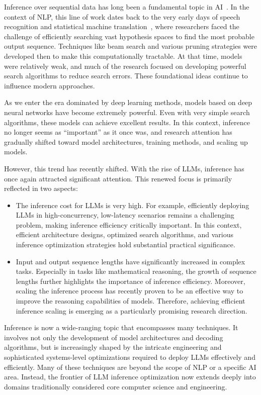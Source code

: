 Inference over sequential data has long been a fundamental topic in AI~\cite{wozengraft-and-reiffen:1961,viterbi:1967error,forney-etal:1972maximum}. In the context of NLP, this line of work dates back to the very early days of speech recognition and statistical machine translation~\cite{Koehn:2010}, where researchers faced the challenge of efficiently searching vast hypothesis spaces to find the most probable output sequence. Techniques like beam search and various pruning strategies were developed then to make this computationally tractable. At that time, models were relatively weak, and much of the research focused on developing powerful search algorithms to reduce search errors. These foundational ideas continue to influence modern approaches.

As we enter the era dominated by deep learning methods, models based on deep neural networks have become extremely powerful. Even with very simple search algorithms, these models can achieve excellent results. In this context, inference no longer seems as ``important'' as it once was, and research attention has gradually shifted toward model architectures, training methods, and scaling up models.

However, this trend has recently shifted. With the rise of LLMs, inference has once again attracted significant attention. This renewed focus is primarily reflected in two aspects:

\begin{itemize}
\item \vspace{0.5em} The inference cost for LLMs is very high. For example, efficiently deploying LLMs in high-concurrency, low-latency scenarios remains a challenging problem, making inference efficiency critically important. In this context, efficient architecture designs, optimized search algorithms, and various inference optimization strategies hold substantial practical significance.
\item \vspace{0.3em} Input and output sequence lengths have significantly increased in complex tasks. Especially in tasks like mathematical reasoning, the growth of sequence lengths further highlights the importance of inference efficiency. Moreover, scaling the inference process has recently proven to be an effective way to improve the reasoning capabilities of models. Therefore, achieving efficient inference scaling is emerging as a particularly promising research direction.
\end{itemize}
\vspace{0.5em}

Inference is now a wide-ranging topic that encompasses many techniques. It involves not only the development of model architectures and decoding algorithms, but is increasingly shaped by the intricate engineering and sophisticated systems-level optimizations required to deploy LLMs effectively and efficiently. Many of these techniques are beyond the scope of NLP or a specific AI area. Instead, the frontier of LLM inference optimization now extends deeply into domains traditionally considered core computer science and engineering.

